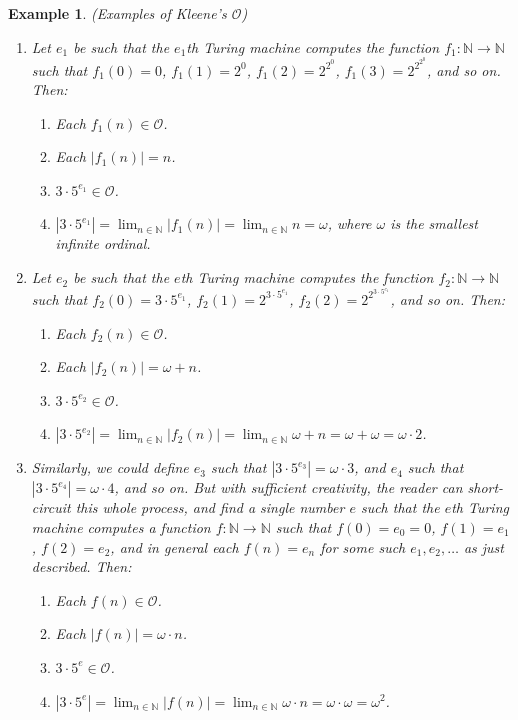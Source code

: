 \documentclass{article}
\newtheorem{example}[theorem]{Example}
\begin{document}
\begin{example}
\label{kleeneexamples}
    (Examples of Kleene's $\mathcal O$)
    \begin{enumerate}
        \item
        Let $e_1$ be such that the $e_1$th Turing machine computes the
        function $f_1:\mathbb N\to\mathbb N$ such that
        $f_1(0)=0$, $f_1(1)=2^0$, $f_1(2)=2^{2^0}$, $f_1(3)=2^{2^{2^0}}$, and so on.
        Then:
        \begin{enumerate}
            \item
            Each $f_1(n)\in\mathcal O$.
            \item
            Each $|f_1(n)|=n$.
            \item
            $3\cdot 5^{e_1}\in \mathcal O$.
            \item
            $|3\cdot 5^{e_1}|=\lim_{n\in\mathbb N}|f_1(n)|=\lim_{n\in\mathbb N}n=\omega$,
            where $\omega$ is the smallest infinite ordinal.
        \end{enumerate}
        \item
        Let $e_2$ be such that the $e$th Turing machine computes the
        function $f_2:\mathbb N\to\mathbb N$ such that
        $f_2(0)=3\cdot 5^{e_1}$, $f_2(1)=2^{3\cdot 5^{e_1}}$,
        $f_2(2)=2^{2^{3\cdot 5^{e_1}}}$, and so on.
        Then:
        \begin{enumerate}
            \item
            Each $f_2(n)\in \mathcal O$.
            \item
            Each $|f_2(n)|=\omega+n$.
            \item
            $3\cdot 5^{e_2}\in\mathcal O$.
            \item
            $|3\cdot 5^{e_2}|=\lim_{n\in\mathbb N}|f_2(n)|=\lim_{n\in\mathbb N}\omega+n
            =\omega+\omega=\omega\cdot 2$.
        \end{enumerate}
        \item
        Similarly, we could define $e_3$ such that $|3\cdot 5^{e_3}|=\omega\cdot 3$,
        and $e_4$ such that $|3\cdot 5^{e_4}|=\omega\cdot 4$, and so on.
        But with sufficient creativity, the reader can short-circuit this whole process,
        and find a single number $e$ such that the $e$th Turing machine computes
        a function $f:\mathbb N\to\mathbb N$ such that
        $f(0)=e_0=0$, $f(1)=e_1$, $f(2)=e_2$,
        and in general each $f(n)=e_n$ for some such $e_1,e_2,\ldots$ as just described.
        Then:
        \begin{enumerate}
            \item
            Each $f(n)\in\mathcal O$.
            \item
            Each $|f(n)|=\omega\cdot n$.
            \item
            $3\cdot 5^e\in\mathcal O$.
            \item
            $|3\cdot 5^e|=\lim_{n\in\mathbb N}|f(n)|
            =\lim_{n\in\mathbb N}\omega\cdot n
            =\omega\cdot\omega=\omega^2$.
        \end{enumerate}
    \end{enumerate}
\end{example}
\end{document}
